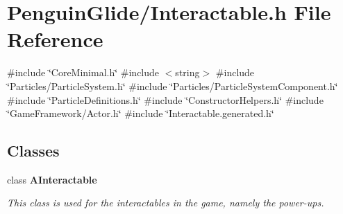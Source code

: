 \section{Penguin\+Glide/\+Interactable.h File Reference}
\label{_interactable_8h}
{\ttfamily \#include \char`\"{}Core\+Minimal.\+h\char`\"{}}\newline
{\ttfamily \#include $<$string$>$}\newline
{\ttfamily \#include \char`\"{}Particles/\+Particle\+System.\+h\char`\"{}}\newline
{\ttfamily \#include \char`\"{}Particles/\+Particle\+System\+Component.\+h\char`\"{}}\newline
{\ttfamily \#include \char`\"{}Particle\+Definitions.\+h\char`\"{}}\newline
{\ttfamily \#include \char`\"{}Constructor\+Helpers.\+h\char`\"{}}\newline
{\ttfamily \#include \char`\"{}Game\+Framework/\+Actor.\+h\char`\"{}}\newline
{\ttfamily \#include \char`\"{}Interactable.\+generated.\+h\char`\"{}}\newline
\subsection*{Classes}
\begin{DoxyCompactItemize}
\item 
class \textbf{ A\+Interactable}
\begin{DoxyCompactList}\small\item\em This class is used for the interactables in the game, namely the power-\/ups. \end{DoxyCompactList}\end{DoxyCompactItemize}
